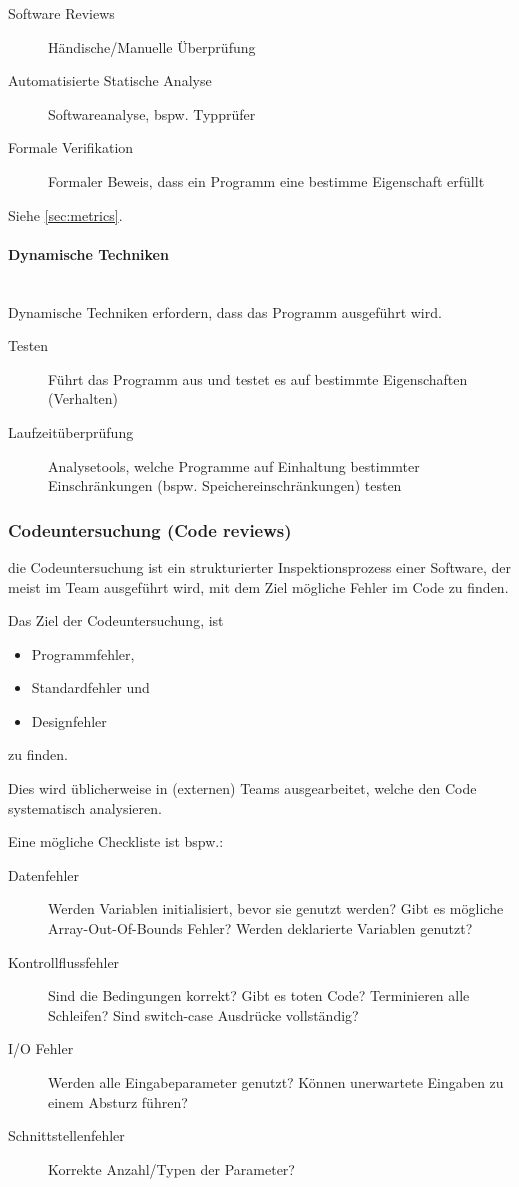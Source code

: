 \documentclass[
    ngerman,
    color=3b,
    summary,
    boxarc,
    main,
]{rubos-tuda-template}
\begin{document}
\begin{description}
    \item[Software Reviews] Händische/Manuelle Überprüfung
    \item[Automatisierte Statische Analyse] Softwareanalyse, bspw. Typprüfer
    \item[Formale Verifikation] Formaler Beweis, dass ein Programm eine bestimme Eigenschaft erfüllt
\end{description}

Siehe \ref{sec:metrics}.

\paragraph{Dynamische Techniken}\mbox{}\\
Dynamische Techniken erfordern, dass das Programm ausgeführt wird.

\begin{description}
    \item[Testen] Führt das Programm aus und testet es auf bestimmte Eigenschaften (Verhalten)
    \item[Laufzeitüberprüfung] Analysetools, welche Programme auf Einhaltung bestimmter Einschränkungen (bspw. Speichereinschränkungen) testen
\end{description}

\clearpage
\subsubsection{Codeuntersuchung (Code reviews)}
\begin{definition}
    die Codeuntersuchung ist ein strukturierter Inspektionsprozess einer Software,
    der meist im Team ausgeführt wird, mit dem Ziel mögliche Fehler im Code zu finden.
\end{definition}
Das Ziel der Codeuntersuchung, ist
\begin{itemize}
    \item Programmfehler,
    \item Standardfehler und
    \item Designfehler
\end{itemize}
zu finden.

Dies wird üblicherweise in (externen) Teams ausgearbeitet, welche den Code systematisch analysieren.

Eine mögliche Checkliste ist bspw.:
\begin{description}
    \item[Datenfehler] Werden Variablen initialisiert, bevor sie genutzt werden? Gibt es mögliche Array-Out-Of-Bounds Fehler? Werden deklarierte Variablen genutzt?
    \item[Kontrollflussfehler] Sind die Bedingungen korrekt? Gibt es toten Code? Terminieren alle Schleifen? Sind switch-case Ausdrücke vollständig?
    \item[I/O Fehler] Werden alle Eingabeparameter genutzt? Können unerwartete Eingaben zu einem Absturz führen?
    \item[Schnittstellenfehler] Korrekte Anzahl/Typen der Parameter?
\end{description}
\end{document}
